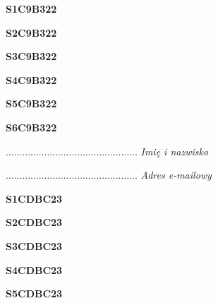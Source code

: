 \begin{turn}{90}\huge \textbf{S1C9B322}\end{turn}

\begin{turn}{90}\huge \textbf{S2C9B322}\end{turn}

\begin{turn}{90}\huge \textbf{S3C9B322}\end{turn}

\begin{turn}{90}\huge \textbf{S4C9B322}\end{turn}

\begin{turn}{90}\huge \textbf{S5C9B322}\end{turn}

\begin{turn}{90}\huge \textbf{S6C9B322}\end{turn}

\begin{turn}{90}\begin{minipage}{\linewidth} \vspace{20mm} ................................................  \textit{Imię i nazwisko}\end{minipage}\end{turn}

\begin{turn}{90}\begin{minipage}{\linewidth} \vspace{20mm} ................................................  \textit{Adres e-mailowy}\end{minipage}\end{turn}

\begin{turn}{90}\huge \textbf{S1CDBC23}\end{turn}

\begin{turn}{90}\huge \textbf{S2CDBC23}\end{turn}

\begin{turn}{90}\huge \textbf{S3CDBC23}\end{turn}

\begin{turn}{90}\huge \textbf{S4CDBC23}\end{turn}

\begin{turn}{90}\huge \textbf{S5CDBC23}\end{turn}

